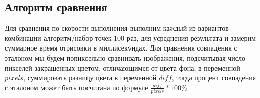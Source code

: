 \begin{table}
	[ht]
	\caption{Описание экспериментов}
	\label{tab:tabular02}
\end{table}

\subsection{Алгоритм сравнения}
Для сравнения по скорости выполнения выполним каждый из вариантов комбинации алгоритм/набор точек 100 раз, для усреднения результата и замерим суммарное время отрисовки в миллисекундах. Для сравнения совпадения с эталоном мы будем попиксельно сравнивать изображения, подсчитывая число пикселей закрашенных цветом, отличающимся от цвета фона, в переменной $pixels$, суммировать разницу цвета в переменной $diff$, тогда процент совпадения с эталоном может быть посчитана по формуле $\frac{diff}{pixels} * 100\%$

